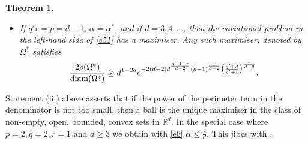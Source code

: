 \documentclass[a4paper,9pt]{article}
\newcommand{\R}{\mathbb{R}}
\newtheorem{theorem}{Theorem}
\begin{document}
\begin{theorem}
\begin{itemize}
\begin{align*}
\end{align*}
and the maximiser $B_1$ is unique (up to homotheties).
\\
\item[\textup{(iv)}]  If $q'r=p=d-1,\,\alpha=\alpha^*$, and if $d=3,4,...$, then the variational problem in the left-hand side of \eqref{e51} has a maximiser. Any such maximiser, denoted by $\Omega^*$
satisfies
\begin{equation}\label{e54}
\frac{2\rho(\Omega^*)}{\textup{diam}(\Omega^*)}\ge  d^{1-2d}e^{-2(d-2)d^{\frac{d-1-r}{d-2}}(d-1)^{\frac{1}{d-2}}\big(\frac{q'+d}{q'+1}\big)^{\frac{r}{d-2}}}.
\end{equation}
\end{itemize}
\end{theorem}
Statement (iii) above asserts that if the power of the perimeter term in the denominator is not too small, then a ball is the unique maximiser in the class of non-empty, open, bounded,  convex sets in $\R^d$. In the special case where $p=2, q=2, r=1$ and $d\ge 3$ we obtain  with \eqref{e6} $\alpha\le \frac2d$. This jibes with \cite[Theorem 3]{vdB1}.
\end{document}
